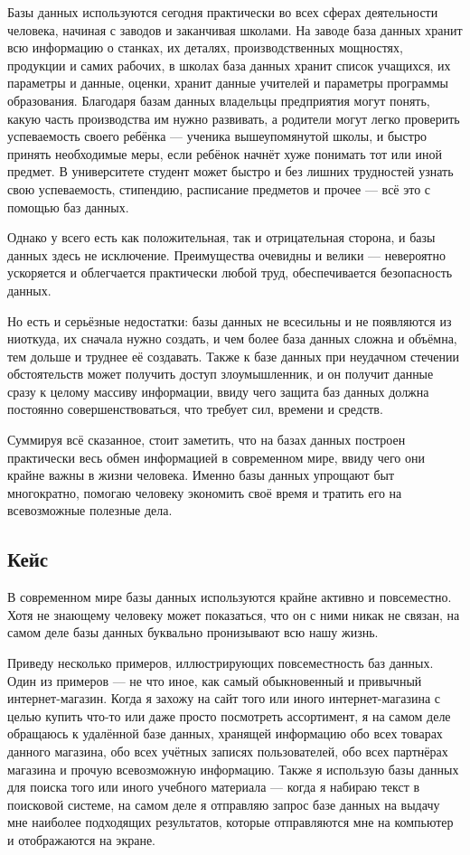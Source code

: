 \documentclass[14pt]{extreport}
\begin{document}
Базы данных используются сегодня практически во всех сферах деятельности человека, начиная с заводов и заканчивая школами. На заводе база данных хранит всю информацию о станках, их деталях, производственных мощностях, продукции и самих рабочих, в школах база данных хранит список учащихся, их параметры и данные, оценки, хранит данные учителей и параметры программы образования. Благодаря базам данных владельцы предприятия могут понять, какую часть производства им нужно развивать, а родители могут легко проверить успеваемость своего ребёнка — ученика вышеупомянутой школы, и быстро принять необходимые меры, если ребёнок начнёт хуже понимать тот или иной предмет. В университете студент может быстро и без лишних трудностей узнать свою успеваемость, стипендию, расписание предметов и прочее — всё это с помощью баз данных.

Однако у всего есть как положительная, так и отрицательная сторона, и базы данных здесь не исключение. Преимущества очевидны и велики — невероятно ускоряется и облегчается практически любой труд, обеспечивается безопасность данных.

Но есть и серьёзные недостатки: базы данных не всесильны и не появляются из ниоткуда, их сначала нужно создать, и чем более база данных сложна и объёмна, тем дольше и труднее её создавать. Также к базе данных при неудачном стечении обстоятельств может получить доступ злоумышленник, и он получит данные сразу к целому массиву информации, ввиду чего защита баз данных должна постоянно совершенствоваться, что требует сил, времени и средств.

Суммируя всё сказанное, стоит заметить, что на базах данных построен практически весь обмен информацией в современном мире, ввиду чего они крайне важны в жизни человека. Именно базы данных упрощают быт многократно, помогаю человеку экономить своё время и тратить его на всевозможные полезные дела.

\subsection{Кейс}

В современном мире базы данных используются крайне активно и повсеместно. Хотя не знающему человеку может показаться, что он с ними никак не связан, на самом деле базы данных буквально пронизывают всю нашу жизнь.

Приведу несколько примеров, иллюстрирующих повсеместность баз данных. Один из примеров — не что иное, как самый обыкновенный и привычный интернет-магазин. Когда я захожу на сайт того или иного интернет-магазина с целью купить что-то или даже просто посмотреть ассортимент, я на самом деле обращаюсь к удалённой базе данных, хранящей информацию обо всех товарах данного магазина, обо всех учётных записях пользователей, обо всех партнёрах магазина и прочую всевозможную информацию. Также я использую базы данных для поиска того или иного учебного материала — когда я набираю текст в поисковой системе, на самом деле я отправляю запрос базе данных на выдачу мне наиболее подходящих результатов, которые отправляются мне на компьютер и отображаются на экране.
\end{document}

